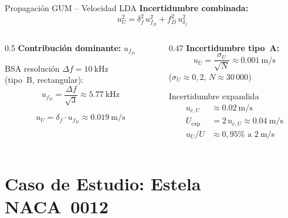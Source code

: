 \documentclass[aspectratio=169,12pt]{beamer}
\begin{document}
\begin{frame}{Propagación GUM -- Velocidad LDA}
	\textbf{Incertidumbre combinada:}
	\begin{equation*}
		u_U^2 = \delta_f^2\,u_{f_D}^2 + f_D^2\,u_{\delta_f}^2
	\end{equation*}

	\vspace{0.3em}
	\begin{columns}
		\begin{column}{0.5\textwidth}
			\textbf{Contribución dominante:} $u_{f_D}$

			\vspace{0.3em}
			BSA resolución $\Delta f = \SI{10}{\kHz}$\\
			(tipo~B, rectangular):
			\begin{equation*}
				u_{f_D} = \frac{\Delta f}{\sqrt{3}}
				\approx \SI{5,77}{\kHz}
			\end{equation*}

			\begin{equation*}
				u_U = \delta_f \cdot u_{f_D}
				\approx \SI{0,019}{\m\per\s}
			\end{equation*}
		\end{column}
		\begin{column}{0.47\textwidth}
			\textbf{Incertidumbre tipo~A:}
			\begin{equation*}
				u_{\bar{U}} = \frac{\sigma_U}{\sqrt{N}}
				\approx \SI{0,001}{\m\per\s}
			\end{equation*}
			($\sigma_U \approx 0{,}2$, $N \approx 30\,000$)

			\vspace{0.3em}
			\begin{block}{Incertidumbre expandida}
				\begin{align*}
					u_{c,U}        & \approx \SI{0,02}{\m\per\s} \\
					U_\mathrm{exp} & = 2\,u_{c,U}
					\approx \SI{0,04}{\m\per\s}                  \\
					u_U / U        & \approx 0{,}95\% \text{ a }
					\SI{2}{\m\per\s}
				\end{align*}
			\end{block}
		\end{column}
	\end{columns}
\end{frame}

\section{Caso de Estudio: Estela NACA~0012}
\end{document}
